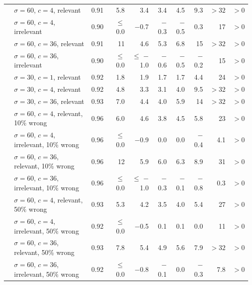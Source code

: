 \begin{tabular}{llrrrrrrrr}
 & $\sigma = 60$, $c = 4$, relevant & 0.91 & 5.8 & 3.4 & 3.4 & 4.5 & 9.3 & $> 32$ & $> 0$ \\
 & $\sigma = 60$, $c = 4$, irrelevant & 0.90 & $\leq$ 0.0 & $-$0.7 & $-$0.3 & $-$0.5 & 0.3 & 17 & $> 0$ \\
 & $\sigma = 60$, $c = 36$, relevant & 0.91 & 11 & 4.6 & 5.3 & 6.8 & 15 & $> 32$ & $> 0$ \\
 & $\sigma = 60$, $c = 36$, irrelevant & 0.90 & $\leq$ 0.0 & $\leq$ $-$1.0 & $-$0.6 & $-$0.5 & $-$0.2 & 15 & $> 0$ \\
 & $\sigma = 30$, $c = 1$, relevant & 0.92 & 1.8 & 1.9 & 1.7 & 1.7 & 4.4 & 24 & $> 0$ \\
 & $\sigma = 30$, $c = 4$, relevant & 0.92 & 4.8 & 3.3 & 3.1 & 4.0 & 9.5 & $> 32$ & $> 0$ \\
 & $\sigma = 30$, $c = 36$, relevant & 0.93 & 7.0 & 4.4 & 4.0 & 5.9 & 14 & $> 32$ & $> 0$ \\
 & $\sigma = 60$, $c = 4$, relevant, 10\% wrong & 0.96 & 6.0 & 4.6 & 3.8 & 4.5 & 5.8 & 23 & $> 0$ \\
 & $\sigma = 60$, $c = 4$, irrelevant, 10\% wrong & 0.96 & $\leq$ 0.0 & $-$0.9 & 0.0 & 0.0 & $-$0.4 & 4.1 & $> 0$ \\
 & $\sigma = 60$, $c = 36$, relevant, 10\% wrong & 0.96 & 12 & 5.9 & 6.0 & 6.3 & 8.9 & 31 & $> 0$ \\
 & $\sigma = 60$, $c = 36$, irrelevant, 10\% wrong & 0.96 & $\leq$ 0.0 & $\leq$ $-$1.0 & $-$0.3 & $-$0.1 & $-$0.8 & 0.3 & $> 0$ \\
 & $\sigma = 60$, $c = 4$, relevant, 50\% wrong & 0.93 & 5.3 & 4.2 & 3.5 & 4.0 & 5.4 & 27 & $> 0$ \\
 & $\sigma = 60$, $c = 4$, irrelevant, 50\% wrong & 0.92 & $\leq$ 0.0 & $-$0.5 & 0.1 & 0.1 & 0.0 & 11 & $> 0$ \\
 & $\sigma = 60$, $c = 36$, relevant, 50\% wrong & 0.93 & 7.8 & 5.4 & 4.9 & 5.6 & 7.9 & $> 32$ & $> 0$ \\
 & $\sigma = 60$, $c = 36$, irrelevant, 50\% wrong & 0.92 & $\leq$ 0.0 & $-$0.8 & $-$0.1 & 0.0 & $-$0.3 & 7.8 & $> 0$ \\
\bottomrule
\end{tabular}
